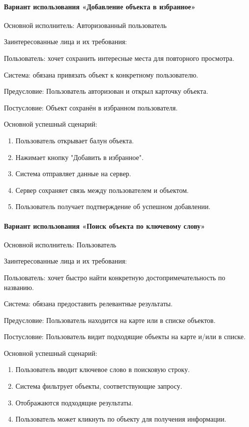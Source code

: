 \paragraph{Вариант использования «Добавление объекта в избранное»}

Основной исполнитель: Авторизованный пользователь

Заинтересованные лица и их требования:

Пользователь: хочет сохранить интересные места для повторного просмотра.

Система: обязана привязать объект к конкретному пользователю.

Предусловие: Пользователь авторизован и открыл карточку объекта.

Постусловие: Объект сохранён в избранном пользователя.

Основной успешный сценарий:
\begin{enumerate}
	\item Пользователь открывает балун объекта.
	\item Нажимает кнопку "Добавить в избранное".
	\item Система отправляет данные на сервер.
	\item Сервер сохраняет связь между пользователем и объектом.
	\item Пользователь получает подтверждение об успешном добавлении.
\end{enumerate}

\paragraph{Вариант использования «Поиск объекта по ключевому слову»}

Основной исполнитель: Пользователь

Заинтересованные лица и их требования:

Пользователь: хочет быстро найти конкретную достопримечательность по названию.

Система: обязана предоставить релевантные результаты.

Предусловие: Пользователь находится на карте или в списке объектов.

Постусловие: Пользователь видит подходящие объекты на карте и/или в списке.

Основной успешный сценарий:
\begin{enumerate}
	\item Пользователь вводит ключевое слово в поисковую строку.
	\item Система фильтрует объекты, соответствующие запросу.
	\item Отображаются подходящие результаты.
	\item Пользователь может кликнуть по объекту для получения информации.
\end{enumerate}

